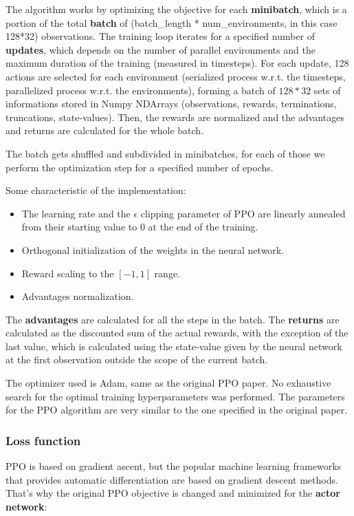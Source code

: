 \documentclass{article}
\begin{document}
The algorithm works by optimizing the objective for each \textbf{minibatch}, which is a portion of the total \textbf{batch} of (batch\_length * num\_environments, in this case 128*32) observations. The training loop iterates for a specified number of \textbf{updates}, which depends on the number of parallel environments and the maximum duration of the training (measured in timesteps). For each update, 128 actions are selected for each environment (serialized process w.r.t. the timesteps, parallelized process w.r.t. the environments), forming a batch of \(128 * 32\) sets of informations stored in Numpy NDArrays (observations, rewards, terminations, truncations, state-values). Then, the rewards are normalized and the advantages and returns are calculated for the whole batch.

The batch gets shuffled and subdivided in minibatches, for each of those we perform the optimization step for a specified number of epochs.

Some characteristic of the implementation:
\begin{itemize}
    \item The learning rate and the \(\epsilon\) clipping parameter of PPO are linearly annealed from their starting value to 0 at the end of the training.
    \item Orthogonal initialization of the weights in the neural network.
    \item Reward scaling to the \([-1,1]\) range.
    \item Advantages normalization.
\end{itemize}

The \textbf{advantages} are calculated for all the steps in the batch. The \textbf{returns} are calculated as the discounted sum of the actual rewards, with the exception of the last value, which is calculated using the state-value given by the neural network at the first observation outside the scope of the current batch.

The optimizer used is Adam, same as the original PPO paper. No exhaustive search for the optimal training hyperparameters was performed. The parameters for the PPO algorithm are very similar to the one specified in the original paper.

\subsubsection{Loss function}
PPO is based on gradient ascent, but the popular machine learning frameworks that provides automatic differentiation are based on gradient descent methods. That's why the original PPO objective is changed and minimized for the \textbf{actor network}:
\end{document}
